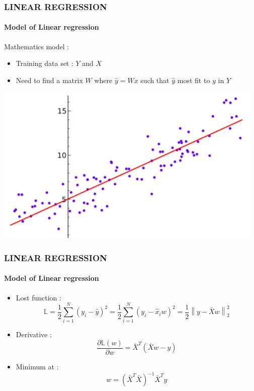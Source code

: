 \documentclass[11pt]{beamer}
\begin{document}
\begin{frame}
	\frametitle{\textbf{LINEAR REGRESSION}}
	\framesubtitle{Model of Linear regression}
	 \begin{minipage}[c]{0.5\textwidth}
		  Mathematics model : 
			\pause
	\begin{itemize}
		\item Training data set : $Y$ and $X$
			\pause
		\item Need to find a matrix $W$ where $\hat{y} = Wx $ such that $\hat{y}$ most fit to $y$ in $Y$
	\end{itemize} 
	\end{minipage}		  
	\begin{minipage}{0.48\textwidth}		
		\includegraphics[width=\textwidth]{LR1.png} 
	\end{minipage}
\end{frame}
\begin{frame}
	\frametitle{\textbf{LINEAR REGRESSION}}
	\framesubtitle{Model of Linear regression}
	\begin{itemize}
		\item Lost function : 
		$$ \mathbb{L} = \dfrac{1}{2}\sum_{i=1}^N(y_i-\hat{y})^2 = \dfrac{1}{2}\sum_{i=1}^N(y_i-\hat{x}_iw)^2 = \dfrac{1}{2}\left\|y-\bar{X}w\right\|^2_2 $$
			\pause
		\item Derivative : 
		$$  \dfrac{\partial\mathbb{L}(w)}{\partial w} = \bar{X}^T \left( \bar{X}w-y \right) $$
			\pause
		\item Minimum at :  $$ w = \left(\bar{X}^T\bar{X}\right)^{-1}\bar{X}^Ty $$
	\end{itemize}

\end{frame}
\end{document}
